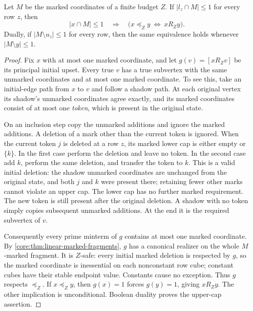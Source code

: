 \begin{lemma}
\label{core:lem:unit-cap-boundary}
Let $M$ be the marked coordinates of a finite budget $Z$.
If $|l_z\cap M|\leq1$ for every row $z$, then
\[
 |x\cap M|\leq1\quad\Longrightarrow\quad
 \bigl(x\preceq_Z y\ \Longleftrightarrow\ xR_Zy\bigr).
\]
Dually, if $|M\setminus u_z|\leq1$ for every row, then the same
 equivalence holds whenever $|M\setminus y|\leq1$.
\end{lemma}
\begin{proof}
Fix $x$ with at most one marked coordinate, and let
$g(v)=[xR_Zv]$ be its principal initial upset. Every true $v$ has a
true subvertex with the same unmarked coordinates and at most one marked
coordinate. To see this, take an initial-edge path from $x$ to $v$ and
follow a shadow path. At each original vertex its shadow's unmarked
coordinates agree exactly, and its marked coordinates consist of at
most one \emph{token}, which is present in the original state.

On an inclusion step copy the unmarked additions and ignore the marked
additions. A deletion of a mark other than the current token is ignored.
When the current token $j$ is deleted at a row $z$, its marked lower cap
is either empty or $\{k\}$. In the first case perform the deletion and
leave no token. In the second case add $k$, perform the same deletion,
and transfer the token to $k$. This is a valid initial deletion: the
shadow unmarked coordinates are unchanged from the original state, and
both $j$ and $k$ were present there; retaining fewer other marks cannot
violate an upper cap. The lower cap has no further marked requirement.
The new token is still present after the original deletion. A shadow
with no token simply copies subsequent unmarked additions. At the end
it is the required subvertex of $v$.

Consequently every prime minterm of $g$ contains at most one marked
coordinate. By \cref{core:thm:linear-marked-fragments}, $g$ has a canonical
realizer on the whole $M$-marked fragment. It is $Z$-safe: every initial
marked deletion is respected by $g$, so the marked coordinate is
inessential on each nonconstant row cube; constant cubes have their
stable endpoint value. Constants cause no exception.
Thus $g$ respects $\preceq_Z$. If $x\preceq_Zy$, then $g(x)=1$ forces
$g(y)=1$, giving $xR_Zy$. The other implication is unconditional.
Boolean duality proves the upper-cap assertion.
\end{proof}

